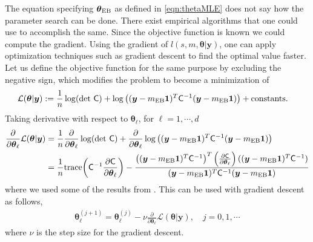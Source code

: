 \documentclass{iitthesis}          %
\newcommand{\bm}[1]{\boldsymbol{#1}}
\newcommand{\trace}[1]{\textup{trace}{#1}}
\newcommand{\vtheta}{{\bm{\theta}}}
\newcommand{\vy}{\bm{y}}
\newcommand{\vone}{\bm{1}}
\newcommand{\mC}{\mathsf{C}}
\newcommand{\mCInv}{{\mathsf{C}^{-1}}}
\newcommand{\MLE}{\textup{EB}}
\begin{document}
 \label{grad_descent_MLE}
The equation specifying $\vtheta_\MLE$ as defined in \eqref{eqn:thetaMLE} does not say how the parameter search can be done. There exist empirical algorithms \cite{Bre73, For77} that one could use to accomplish the same.
Since the objective function is known we could compute the gradient.
Using the gradient of $l(s,m,\vtheta | \vy)$, one can apply optimization techniques such as gradient descent to find the optimal value faster. Let us define the objective function for the same purpose by excluding the negative sign, which modifies the problem to become a minimization of
\begin{align*}
\mathcal{L}(\vtheta | \vy)
&:= \frac{1}{n} \log(\det\, \mC) +  \log\left( (\vy-m_\MLE\vone)^T\mCInv(\vy-m_\MLE\vone) \right) + \text{constants.}
\end{align*}
Taking derivative with respect to $\vtheta_\ell$, for $\ell=1,\cdots,d$
\begin{align*}
\frac{\partial}{\partial \vtheta_\ell} \mathcal{L}(\vtheta | \vy)
&=  \frac{1}{n} \frac{\partial}{\partial \vtheta_\ell} \log(\det\, \mC) + \frac{\partial}{\partial \vtheta_\ell} 
\log\left((\vy-m_\MLE\vone)^T\mCInv(\vy-m_\MLE\vone) \right)
\\
&= \frac 1n \trace{\left( \mCInv \frac{\partial \mC}{\partial \vtheta_\ell} \right)}
- 
\frac
{\left((\vy-m_\MLE\vone)^T\mCInv\right)^T 
	\left( \frac{\partial \mC}{\partial \vtheta_\ell} \right)
	((\vy-m_\MLE\vone)^T\mCInv)}
{(\vy-m_\MLE\vone)^T\mCInv(\vy-m_\MLE\vone)}
\end{align*}
where we used some of the results from \cite{Dong2017a}. 
This can be used with gradient descent as follows,
\begin{align}
\label{eqn:deep_descent}
\vtheta_\ell^{(j+1)} = \vtheta_\ell^{(j)} - \nu \frac{\partial}{\partial \vtheta_\ell} \mathcal{L}(\vtheta | \vy), \quad j=0,1,\cdots
\end{align}
where $\nu$ is the step size for the gradient descent. 




\end{document}
